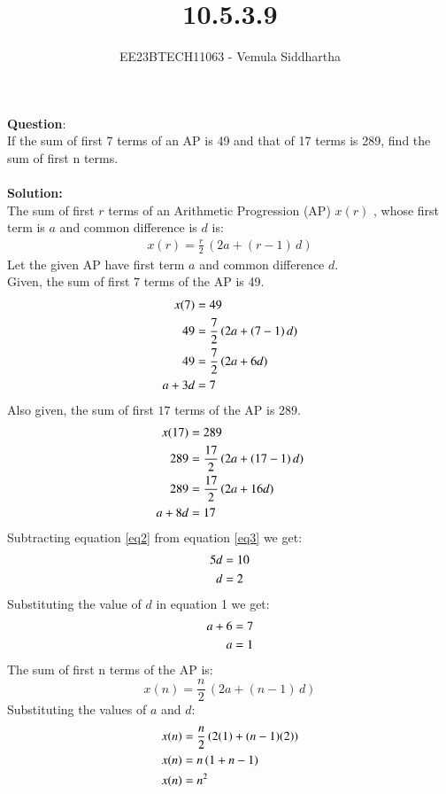 \documentclass[journal,12pt,twocolumn]{IEEEtran}
\theoremstyle{remark}
\begin{document}

\vspace{3cm}

\title{10.5.3.9}
\author{EE23BTECH11063 - Vemula Siddhartha
}
\maketitle
\newpage
\bigskip

\renewcommand{\thefigure}{\theenumi}
\renewcommand{\thetable}{\theenumi}
\textbf{Question}:\\
If the sum of first 7 terms of an AP is 49 and that of 17 terms is 289, find the sum of
first n terms.
\\\\
\textbf{Solution: }\\
The sum of first $r$ terms of an Arithmetic Progression (AP) $x(r)$ , whose first term is $a$ and common difference is $d$ is:
\begin{align}
x(r)=\frac{r}{2}\,(2a+(r-1)\,d)\label{eq1}
\end{align}
Let the given AP have first term $a$ and common difference $d$.\\
Given, the sum of first $7$ terms of the AP is 49.
\begin{align}
x(7)&=49\notag\\
49&=\frac{7}{2}\,(2a+(7-1)\,d)\notag\\
49&=\frac{7}{2}\,(2a+6d)\notag\\
a+3d&=7\label{eq2}
\end{align}
Also given, the sum of first $17$ terms of the AP is 289.
\begin{align}
x(17)&=289\notag\\
289&=\frac{17}{2}\,(2a+(17-1)\,d)\notag\\
289&=\frac{17}{2}\,(2a+16d)\notag\\
a+8d&=17\label{eq3}
\end{align}
Subtracting equation \ref{eq2} from equation \ref{eq3} we get:
\begin{align}
5d&=10\notag\\
d&=2\label{eq4}
\end{align}
Substituting the value of $d$ in equation 1 we get:
\begin{align}
a+6&=7\notag\\
a&=1\label{eq5}
\end{align}
The sum of first n terms of the AP is:
\[x(n)= \frac{n}{2}\,(2a+(n-1)\,d)\]
Substituting the values of $a$ and $d$:
\begin{align}
x(n)&=\frac{n}{2}\,(2(1)+(n-1)(2))\notag\\
x(n)&=n\,(1+n-1)\notag\\
x(n)&=n^2\label{eq6}
\end{align}
\end{document}
